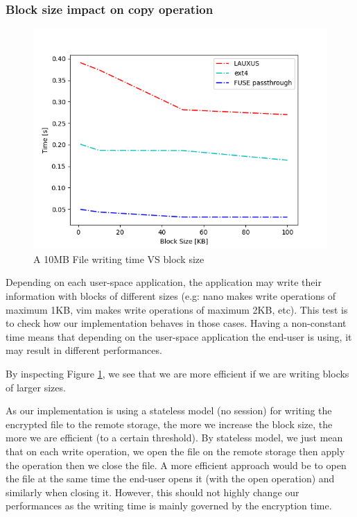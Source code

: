 \documentclass[../main.tex]{subfiles}
\begin{document}
\subsubsection{Block size impact on copy operation}
\label{section:analysis:block_size_impact}
\begin{figure}[h]
    \centering
    \includegraphics[width=.8\textwidth]{images/analysis/per_block_size}
    
    \caption{A 10MB File writing time VS block size}
    \label{figure:analysis:block_size_impact}
\end{figure}
\par Depending on each user-space application, the application may write their information with blocks of different sizes (e.g: nano makes write operations of maximum 1KB, vim makes write operations of maximum 2KB, etc). This test is to check how our implementation behaves in those cases. Having a non-constant time means that depending on the user-space application the end-user is using, it may result in different performances.
\par By inspecting Figure \ref{figure:analysis:block_size_impact}, we see that we are more efficient if we are writing blocks of larger sizes.
\par As our implementation is using a stateless model (no session) for writing the encrypted file to the remote storage, the more we increase the block size, the more we are efficient (to a certain threshold). By stateless model, we just mean that on each write operation, we open the file on the remote storage then apply the operation then we close the file. A more efficient approach would be to open the file at the same time the end-user opens it (with the open operation) and similarly when closing it. However, this should not highly change our performances as the writing time is mainly governed by the encryption time.
\end{document}
